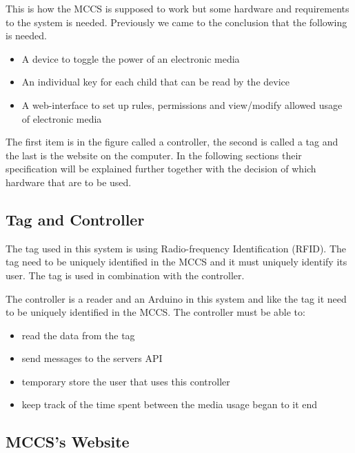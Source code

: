 This is how the MCCS is supposed to work but some hardware and requirements to the system is needed. Previously we came to the conclusion that the following is needed.
\begin{itemize}
	\item A device to toggle the power of an electronic media
	\item An individual key for each child that can be read by the device
	\item A web-interface to set up rules, permissions and view/modify allowed usage of electronic media
\end{itemize} 

The first item is in the figure called a controller, the second is called a tag and the last is the website on the computer. In the following sections their specification will be explained further together with the decision of which hardware that are to be used. 
\subsection{Tag and Controller}
The tag used in this system is using Radio-frequency Identification (RFID). The tag need to be uniquely identified in the MCCS and it must uniquely identify its user. The tag is used in combination with the controller.

The controller is a reader and an Arduino in this system and like the tag it need to be uniquely identified in the MCCS. The controller must be able to:

\begin{itemize}
	\item read the data from the tag
	\item send messages to the servers API
	\item temporary store the user that uses this controller
	\item keep track of the time spent between the media usage began to it end
\end{itemize}
 

\subsection{MCCS's Website}




%
%

